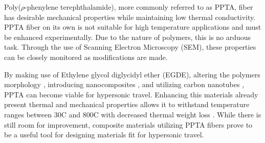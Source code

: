 \documentclass[12pt, twocolumn]{article}
\begin{document}
\indent Poly($\rho$-phenylene terephthalamide), more commonly referred to as PPTA, fiber has desirable mechanical properties while maintaining low thermal conductivity.\citep{LiTong2022} PPTA fiber on its own is not suitable for high temperature applications and must be enhanced experimentally. Due to the nature of polymers, this is no arduous task. Through the use of Scanning Electron Microscopy (SEM), these properties can be closely monitored as modifications are made. 

\indent By making use of Ethylene glycol diglycidyl ether (EGDE)\citep{LeiWang2017}, altering the polymers morphology \citep{Kanbargi2017}, introducing nanocomposites \citep{BoZhang2021}, and utilizing carbon nanotubes \citep{Yang2019}, PPTA can become viable for hypersonic travel. Enhancing this materials already present thermal and mechanical properties allows it to withstand temperature ranges between 30\degree C and 800\degree C with decreased thermal weight loss \citep{ShushengChen2014}. While there is still room for improvement, composite materials utilizing PPTA fibers prove to be a useful tool for designing materials fit for hypersonic travel.


 
\end{document}
